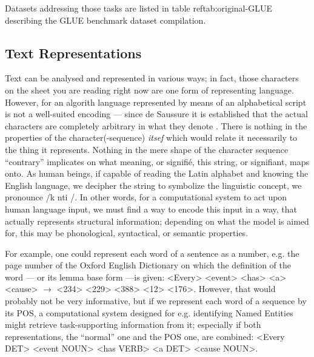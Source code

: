 Datasets addressing those tasks are listed in table ref{tab:original-GLUE} describing the GLUE
benchmark dataset compilation.


\subsection{Text Representations}

Text can be analysed and represented in various ways; in fact, those characters on the
sheet you are reading right now are one form of representing language. However, for an
algorith language represented by means of an alphabetical script is not a well-suited
encoding --- since de Saussure it is established that the actual characters are completely
arbitrary in what they denote \citep{de1989cours}. There is nothing in the properties of
the character(-sequence) \emph{itsef} which would relate it necessarily to the thing it
represents. Nothing in the mere shape of the character sequence ``contrary'' implicates
on what meaning, or signifié, this string, or signifiant, maps onto. As human beings, if
capable of reading the Latin alphabet and knowing the English language, we decipher the
string to symbolize the linguistic concept, we pronounce /\textprimstress k\textscripta
nt\textturnr \textschwa \textturnr i /. In other words, for a computational system to act
upon human language input, we must find a way to encode this input in a way, that actually
represents structural information; depending on what the model is aimed for, this may be
phonological, syntactical, or semantic properties.

For example, one could represent each word of a sentence as a number, e.g. the page number of the
Oxford English Dictionary on which the definition of the word --- or its lemma base form ---is
given: <Every> <event> <has> <a> <cause> $\rightarrow$ <234> <229> <388> <12> <176>. However, that
would probably not be very informative, but if we represent each word of a sequence by its POS, a
computational system designed for e.g. identifying Named Entities might retrieve task-supporting
information from it; especially if both representations, the ``normal'' one and the POS one, are
combined: <Every DET> <event NOUN> <has VERB> <a DET> <cause NOUN>.



